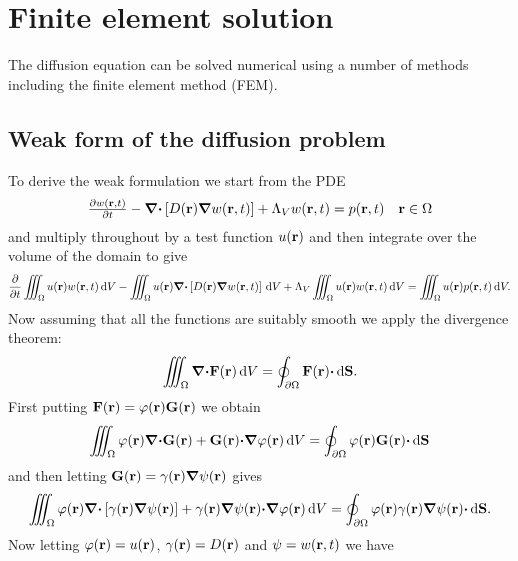 \documentclass[a4paper]{article}
\numberwithin{equation}{section}
\providecommand\oiint{\oint}
\begin{document}
\section[Finite element solution]{Finite element solution}
\label{sc:fem}

The diffusion equation can be solved numerical using a number of methods
including the finite element method (FEM).

\subsection[Weak form of the diffusion problem]{Weak form of the diffusion problem}
\label{sc:fem:weak}

To derive the weak formulation we start from the PDE
\begin{align}
\begin{matrix}
\frac{{\partial}w(\boldsymbol{\mathrm{r}},t)}{{\partial}t}-{\boldsymbol{\mathrm{\nabla}}}{\boldsymbol{\mathrm{\cdot}}}\left[D(\boldsymbol{\mathrm{r}}){\boldsymbol{\mathrm{\nabla}}}w(\boldsymbol{\mathrm{r}},t)\right]+\Lambda_V w(\boldsymbol{\mathrm{r}},t)=p(\boldsymbol{\mathrm{r}},t) &\boldsymbol{\mathrm{r}}\in\Omega 
\end{matrix}
\end{align}
and multiply throughout by a test function $u(\boldsymbol{\mathrm{r}})$ and then integrate over the volume of the domain to give 
\begin{align}
\frac{{\partial}}{{\partial}t}\iiint_{\Omega} u(\boldsymbol{\mathrm{r}}) w(\boldsymbol{\mathrm{r}},t)\,\mathrm{d}{V}
-\iiint_{\Omega} u(\boldsymbol{\mathrm{r}}){\boldsymbol{\mathrm{\nabla}}}{\boldsymbol{\mathrm{\cdot}}}\left[D(\boldsymbol{\mathrm{r}}){\boldsymbol{\mathrm{\nabla}}}w(\boldsymbol{\mathrm{r}},t)\right]\,\mathrm{d}{V}
+\Lambda_V \iiint_{\Omega } u(\boldsymbol{\mathrm{r}}) w(\boldsymbol{\mathrm{r}},t)\,\mathrm{d}{V}
=\iiint_{\Omega} u(\boldsymbol{\mathrm{r}}) p(\boldsymbol{\mathrm{r}},t)\,\mathrm{d}{V}.
\end{align}
Now assuming that all the functions are suitably smooth we apply the divergence
theorem: 
\begin{align}
\iiint_{\Omega} {\vnabla}{\vcdot}\vF\pr\dif{V} = \oiint_{\partial\Omega}\vF\pr{\vcdot}\dif{\vS}.
\end{align}
First putting $\boldsymbol{\mathrm{F}}(\boldsymbol{\mathrm{r}})=\varphi(\boldsymbol{\mathrm{r}})\boldsymbol{\mathrm{G}}(\boldsymbol{\mathrm{r}})$ we obtain
\begin{align}
\iiint_{\Omega} \varphi\pr{\vnabla}{\vcdot}\vG\pr+\vG\pr{\vcdot}{\vnabla}\varphi\pr\dif{V}
=\oiint_{\partial\Omega } \varphi\pr\vG\pr{\vcdot}\dif{\vS}
\end{align}
and then letting $\boldsymbol{\mathrm{G}}(\boldsymbol{\mathrm{r}})=\gamma(\boldsymbol{\mathrm{r}}){\boldsymbol{\mathrm{\nabla}}}\psi(\boldsymbol{\mathrm{r}})$ gives
\begin{align}
\iiint_{\Omega} \varphi\pr{\vnabla}{\vcdot}\left[\gamma\pr{\vnabla}\psi\pr\right]+\gamma\pr{\vnabla}\psi\pr{\vcdot}{\vnabla}\varphi\pr\dif{V}
=\oiint_{\partial\Omega }\varphi\pr\gamma\pr{\vnabla}\psi\pr{\vcdot}\dif{\vS}.
\end{align}
Now letting $\varphi(\boldsymbol{\mathrm{r}})=u(\boldsymbol{\mathrm{r}})$, $\gamma(\boldsymbol{\mathrm{r}})=D(\boldsymbol{\mathrm{r}})$ and $\psi=w(\boldsymbol{\mathrm{r}},t)$ we have
\end{document}
